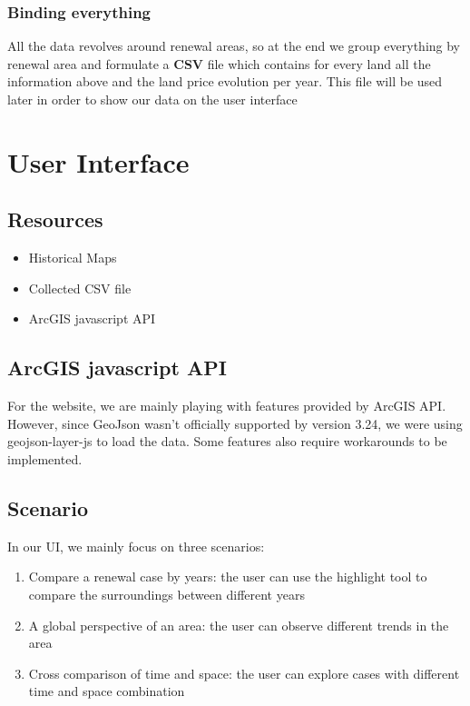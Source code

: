 \documentclass[12pt]{article}
\begin{document}
\subsubsection{Binding everything}
All the data revolves around renewal areas, so at the end we group everything by renewal area and formulate a \textbf{CSV} file which contains for every land all the information above and the land price evolution per year. This file will be used later in order to show our data on the user interface

\section{User Interface}
\subsection{Resources}
\begin{itemize}
\item Historical Maps
\item Collected CSV file
\item ArcGIS javascript API
\end{itemize}

\subsection{ArcGIS javascript API}
For the website, we are mainly playing with features provided by ArcGIS API. However, since GeoJson wasn't officially supported by version 3.24, we were using geojson-layer-js to load the data. Some features also require workarounds to be implemented.

\subsection{Scenario}
In our UI, we mainly focus on three scenarios:
\begin{enumerate}
\item Compare a renewal case by years: the user can use the highlight tool to compare the surroundings between different years
\item A global perspective of an area: the user can observe different trends in the area
\item Cross comparison of time and space: the user can explore cases with different time and space combination
\end{enumerate}
\end{document}
